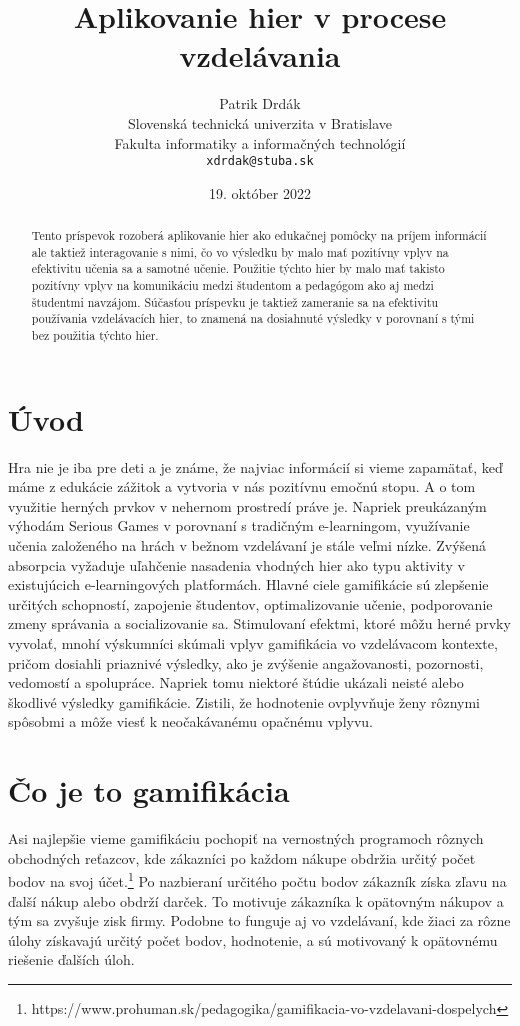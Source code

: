 \documentclass[10pt,twoside,slovak,a4paper]{article}
\title{Aplikovanie hier v procese vzdelávania
} %
\author{Patrik Drdák\\[2pt]
	{\small Slovenská technická univerzita v Bratislave}\\
	{\small Fakulta informatiky a informačných technológií}\\
	{\small \texttt{xdrdak@stuba.sk}}
	}
\date{\small 19. október 2022} %
\begin{document}
\maketitle

\begin{abstract}
Tento príspevok rozoberá aplikovanie hier
ako edukačnej pomôcky na príjem informácií ale taktiež interagovanie s nimi,
čo vo výsledku by malo mať pozitívny vplyv na efektivitu učenia sa a samotné
učenie. Použitie týchto hier by malo mať takisto pozitívny vplyv na komunikáciu medzi študentom a pedagógom ako aj medzi študentmi navzájom. Súčasťou príspevku je taktiež zameranie sa na efektivitu používania vzdelávacích hier, to znamená na dosiahnuté výsledky v porovnaní s tými bez použitia týchto hier.

\end{abstract}



\section{Úvod}

Hra nie je iba pre deti a je známe, že najviac informácií si vieme zapamätať, keď máme z edukácie zážitok a vytvoria v nás pozitívnu emočnú stopu. A o tom využitie herných prvkov v nehernom prostredí práve je. Napriek preukázaným výhodám Serious Games v porovnaní s tradičným e-learningom, využívanie učenia založeného na hrách
v bežnom vzdelávaní je stále veľmi nízke. Zvýšená absorpcia
vyžaduje uľahčenie nasadenia vhodných hier ako typu aktivity
v existujúcich e-learningových platformách. Hlavné ciele gamifikácie sú zlepšenie určitých schopností, zapojenie študentov, optimalizovanie učenie, podporovanie zmeny správania a socializovanie sa. Stimulovaní efektmi, ktoré môžu herné prvky vyvolať, mnohí výskumníci skúmali vplyv gamifikácia vo vzdelávacom kontexte, pričom dosiahli priaznivé výsledky, ako je zvýšenie angažovanosti, pozornosti, vedomostí a spolupráce. Napriek tomu niektoré štúdie ukázali neisté alebo škodlivé výsledky gamifikácie. Zistili, že hodnotenie ovplyvňuje ženy rôznymi spôsobmi a môže viesť k neočakávanému opačnému vplyvu.

\section{Čo je to gamifikácia}
Asi najlepšie vieme gamifikáciu pochopiť na vernostných programoch rôznych obchodných reťazcov, kde zákazníci po každom nákupe obdržia určitý počet bodov na svoj účet.\footnote{https://www.prohuman.sk/pedagogika/gamifikacia-vo-vzdelavani-dospelych} Po nazbieraní určitého počtu bodov zákazník získa zľavu na ďalší nákup alebo obdrží darček. To motivuje zákazníka k opätovným nákupov a tým sa zvyšuje zisk firmy. Podobne to funguje aj vo vzdelávaní, kde žiaci za rôzne úlohy získavajú určitý počet bodov, hodnotenie, a sú motivovaný k opätovnému riešenie ďalších úloh. 
\end{document}
